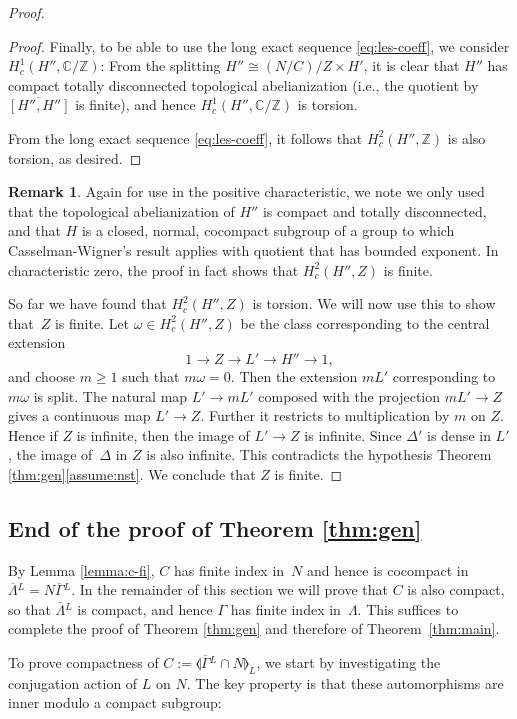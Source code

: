 \documentclass[11pt]{article}
\newcommand{\ie}{i.e.,\xspace}
\numberwithin{equation}{section}\providecommand{\llangle}{\langle\!\langle}\providecommand{\rrangle}{\rangle\!\rangle}\providecommand{\Asterisk}{\ast}
\newcommand{\oGL}{\ensuremath{\overline{\Gamma}{}^L}}
\newcommand{\oLL}{\ensuremath{\overline{\Lambda}{}^L}}
\newcommand{\bbC}{\ensuremath{\mathbb{C}}}
\newcommand{\bbZ}{\ensuremath{\mathbb{Z}}}
\theoremstyle{definition}
\newtheorem{rem}[thm]{Remark}
\begin{document}
\begin{proof}
\begin{proof}
Finally, to be able to use the long exact sequence \eqref{eq:les-coeff}, we consider $H^1_c(H'',\bbC/\bbZ)$: From the splitting $H''\cong (N/C)/Z\times H'$, it is clear that $H''$ has compact totally disconnected topological abelianization (\ie the quotient by $\overline{[H'',H'']}$ is finite), and hence $H^1_c(H'',\bbC/\bbZ)$ is torsion.

From the long exact sequence \eqref{eq:les-coeff}, it follows that $H^2_c(H'',\bbZ)$ is also torsion, as desired.\end{proof}

\begin{rem} Again for use in the positive characteristic, we note we only used that the topological abelianization of $H''$ is compact and totally disconnected, and that $H$ is a closed, normal, cocompact subgroup of a group to which Casselman-Wigner's result applies with quotient that has bounded exponent. In characteristic zero, the proof in fact shows that $H^2_c(H'',Z)$ is finite. \end{rem}

So far we have found that $H^2_c(H'',Z)$ is torsion. We will now use this to show that~$Z$ is finite. Let $\omega\in H^2_c(H'',Z)$ be the class corresponding to the central extension
\[
1\to Z\to L'\to H''\to 1,
\]
and choose $m\geq 1$ such that $m\omega =0$. Then the extension $mL'$ corresponding to $m\omega$ is split. The natural map $L'\to mL'$ composed with the projection $mL'\to Z$ gives a continuous map $L'\to Z$. Further it restricts to multiplication by $m$ on $Z$. Hence if $Z$ is infinite, then the image of $L'\to Z$ is infinite. Since $\Delta'$ is dense in $L'$, the image of~$\Delta$ in $Z$ is also infinite. This contradicts the hypothesis Theorem \ref{thm:gen}\eqref{assume:nst}. We conclude that $Z$ is finite. \end{proof}

\subsection{End of the proof of Theorem \ref{thm:gen}}\label{sec:end}

By Lemma \ref{lemma:c-fi}, $C$ has finite index in~$N$ and hence is cocompact in $\oLL=N\oGL$. In the remainder of this section we will prove that $C$ is also compact, so that $\oLL$ is compact, and hence $\Gamma$ has finite index in~$\Lambda$. This suffices to complete the proof of Theorem \ref{thm:gen} and therefore of Theorem~\ref{thm:main}.

To prove compactness of $C :=\llangle \oGL\cap N\rrangle_L$, we start by investigating the conjugation action of $L$ on $N$. The key property is that these automorphisms are inner modulo a compact subgroup:
\end{document}
